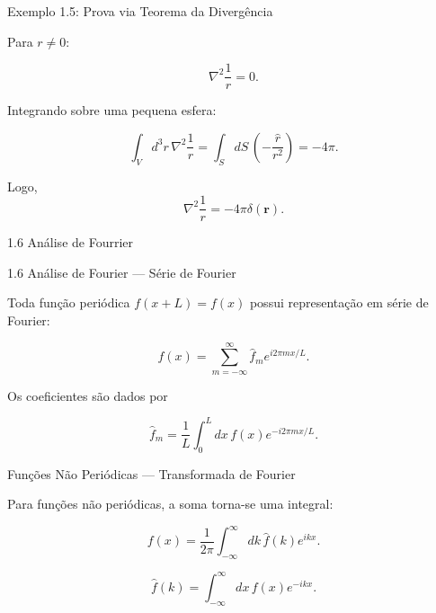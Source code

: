 \documentclass[aspectratio=169]{beamer}
\newcommand{\blue}[1]{\textcolor{myblue}{#1}}
\begin{document}
\begin{frame}{Exemplo 1.5: Prova via Teorema da Divergência}

Para $r\neq 0$:

\[
\nabla^2 \frac{1}{r}=0.
\]

Integrando sobre uma pequena esfera:

\[
\int_V d^3r\, \nabla^2 \frac{1}{r}
=
\int_S dS\, \left(-\frac{\hat r}{r^2}\right)
=
-4\pi.
\]

\begin{tcolorbox}[colback=blue!5,colframe=blue]
Logo,
\[
\nabla^2 \frac{1}{r}
=
-4\pi\delta(\mathbf r).
\]
\end{tcolorbox}

\end{frame}


\begin{frame}[plain]
\centering
\vfill
{\Huge\blue{1.6 Análise de Fourrier}}
\vfill
\end{frame}



\begin{frame}{1.6 Análise de Fourier — Série de Fourier}

Toda função periódica $f(x+L)=f(x)$ possui representação em série de Fourier:

\begin{equation}
f(x)=\sum_{m=-\infty}^{\infty}
\hat f_m e^{i2\pi m x/L}.
\tag{1.123}
\end{equation}

Os coeficientes são dados por

\begin{equation}
\hat f_m=
\frac{1}{L}
\int_0^L dx\, f(x)e^{-i2\pi m x/L}.
\tag{1.124}
\end{equation}

\end{frame}

\begin{frame}{Funções Não Periódicas — Transformada de Fourier}

Para funções não periódicas, a soma torna-se uma integral:

\begin{equation}
f(x)=
\frac{1}{2\pi}
\int_{-\infty}^{\infty}
dk\, \hat f(k)e^{ikx}.
\tag{1.125}
\end{equation}

\begin{equation}
\hat f(k)=
\int_{-\infty}^{\infty}
dx\, f(x)e^{-ikx}.
\tag{1.126}
\end{equation}

\end{frame}
\end{document}
